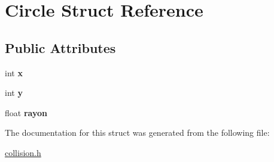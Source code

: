 \hypertarget{structCircle}{}\section{Circle Struct Reference}
\label{structCircle}
\subsection*{Public Attributes}
\begin{DoxyCompactItemize}
\item 
\mbox{\label{structCircle_abceecd15b990054ddc30441cfcbb205d}} 
int {\bfseries x}
\item 
\mbox{\label{structCircle_a78aef28b3c176d14e8d25f8cd84e7dfd}} 
int {\bfseries y}
\item 
\mbox{\label{structCircle_a071d166f8d58ab6f055cdbbf494b33ce}} 
float {\bfseries rayon}
\end{DoxyCompactItemize}


The documentation for this struct was generated from the following file\+:\begin{DoxyCompactItemize}
\item 
\hyperlink{collision_8h}{collision.\+h}\end{DoxyCompactItemize}
